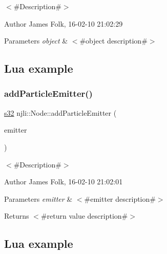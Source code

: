 $<$\#\+Description\#$>$ 

\begin{DoxyAuthor}{Author}
James Folk, 16-\/02-\/10 21\+:02\+:29
\end{DoxyAuthor}

\begin{DoxyParams}{Parameters}
{\em object} & $<$\#object description\#$>$\\
\hline
\end{DoxyParams}
\hypertarget{classnjli_1_1_steering_behavior_wander_ex1}{}\subsection{Lua example}\label{classnjli_1_1_steering_behavior_wander_ex1}

\begin{DoxyCodeInclude}
\end{DoxyCodeInclude}
\mbox{\label{classnjli_1_1_node_ac61c06f12dc9129c1c575515343c9a5c}} 
\subsubsection{\texorpdfstring{add\+Particle\+Emitter()}{addParticleEmitter()}}
{\footnotesize\ttfamily \mbox{\hyperlink{_util_8h_aa62c75d314a0d1f37f79c4b73b2292e2}{s32}} njli\+::\+Node\+::add\+Particle\+Emitter (\begin{DoxyParamCaption}\item[{\mbox{\hyperlink{classnjli_1_1_particle_emitter}{Particle\+Emitter}} $\ast$}]{emitter }\end{DoxyParamCaption})}



$<$\#\+Description\#$>$ 

\begin{DoxyAuthor}{Author}
James Folk, 16-\/02-\/10 21\+:02\+:01
\end{DoxyAuthor}

\begin{DoxyParams}{Parameters}
{\em emitter} & $<$\#emitter description\#$>$\\
\hline
\end{DoxyParams}
\begin{DoxyReturn}{Returns}
$<$\#return value description\#$>$
\end{DoxyReturn}
\hypertarget{classnjli_1_1_steering_behavior_wander_ex1}{}\subsection{Lua example}\label{classnjli_1_1_steering_behavior_wander_ex1}

